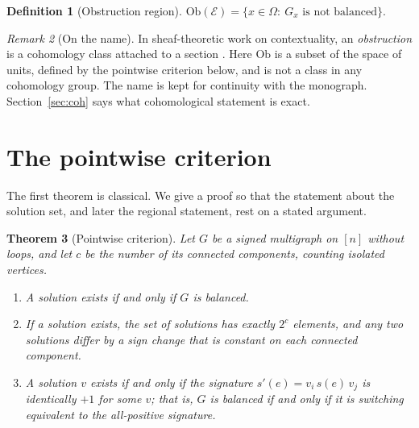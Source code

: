 \documentclass[11pt]{article}
\theoremstyle{plain}
\newtheorem{theorem}{Theorem}
\theoremstyle{definition}
\newtheorem{definition}[theorem]{Definition}
\theoremstyle{remark}
\newtheorem{remark}[theorem]{Remark}
\newcommand{\Om}{\Omega}
\newcommand{\Ob}{\mathrm{Ob}}
\begin{document}
\begin{definition}[Obstruction region]\label{def:ob}
$\Ob(\mathcal E)=\{x\in\Om:\ G_x\text{ is not balanced}\}$.
\end{definition}

\begin{remark}[On the name]
In sheaf-theoretic work on contextuality, an \emph{obstruction} is a cohomology class attached to a section \cite{abramsky2015}. Here $\Ob$ is a subset of the space of units, defined by the pointwise criterion below, and is not a class in any cohomology group. The name is kept for continuity with the monograph. Section~\ref{sec:coh} says what cohomological statement is exact.
\end{remark}

\section{The pointwise criterion}\label{sec:pointwise}

The first theorem is classical. We give a proof so that the statement about the solution set, and later the regional statement, rest on a stated argument.

\begin{theorem}[Pointwise criterion]\label{thm:pointwise}
Let $G$ be a signed multigraph on $[n]$ without loops, and let $c$ be the number of its connected components, counting isolated vertices.
\begin{enumerate}[label=(\alph*)]
\item A solution exists if and only if $G$ is balanced.
\item If a solution exists, the set of solutions has exactly $2^{c}$ elements, and any two solutions differ by a sign change that is constant on each connected component.
\item A solution $v$ exists if and only if the signature $s'(e)=v_i\,s(e)\,v_j$ is identically $+1$ for some $v$; that is, $G$ is balanced if and only if it is switching equivalent to the all-positive signature.
\end{enumerate}
\end{theorem}
\end{document}

